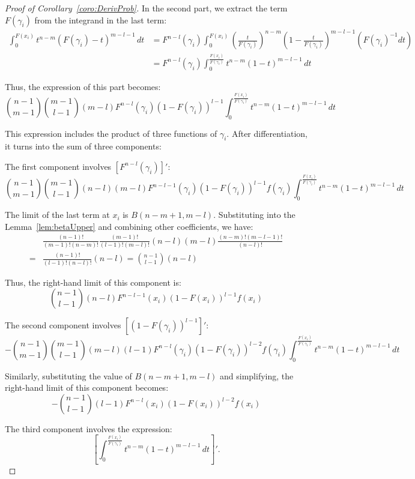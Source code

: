 \begin{proof}[Proof of Corollary~\ref{coro:DerivProb}]
In the second part, we extract the term \( F(\gamma_i) \) from the integrand in the last term:
\[
\begin{aligned}
    \int_{0}^{F(x_i)} t^{n-m} (F(\gamma_i) - t)^{m-l-1} \, dt &= F^{n-l}(\gamma_i) \int_{0}^{F(x_i)} \left(\frac{t}{F(\gamma_i)}\right)^{n-m} \left(1 - \frac{t}{F(\gamma_i)}\right)^{m-l-1} \left(F(\gamma_i)^{-1} dt\right) \\
    &= F^{n-l}(\gamma_i) \int_0^{\frac{F(x_i)}{F(\gamma_i)}} t^{n-m} (1-t)^{m-l-1} \, dt
\end{aligned}
\]

Thus, the expression of this part becomes:
\[
\binom{n-1}{m-1} \binom{m-1}{l-1} (m-l) F^{n-l}(\gamma_i) (1-F(\gamma_i))^{l-1} \int_0^{\frac{F(x_i)}{F(\gamma_i)}} t^{n-m} (1-t)^{m-l-1} \, dt
\]

This expression includes the product of three functions of \(\gamma_i\). After differentiation, it turns into the sum of three components:

The first component involves \([F^{n-l}(\gamma_i)]'\):
\[
\binom{n-1}{m-1} \binom{m-1}{l-1} (n-l) (m-l) F^{n-l-1}(\gamma_i) (1-F(\gamma_i))^{l-1} f(\gamma_i) \int_0^{\frac{F(x_i)}{F(\gamma_i)}} t^{n-m} (1-t)^{m-l-1} \, dt
\]

The limit of the last term at $x_i$ is \(B(n-m+1, m-l)\). Substituting into the Lemma~\ref{lem:betaUpper} and combining other coefficients, we have:
\[
\begin{aligned}
    & \frac{(n-1)!}{(m-1)!(n-m)!} \frac{(m-1)!}{(l-1)!(m-l)!} (n-l) (m-l) \frac{(n-m)!(m-l-1)!}{(n-l)!} \\
    = & \frac{(n-1)!}{(l-1)!(n-l)!} (n-l) = \binom{n-1}{l-1}(n-l)
\end{aligned}
\]

Thus, the right-hand limit of this component is:
\[
\binom{n-1}{l-1} (n-l) F^{n-l-1}(x_i) (1-F(x_i))^{l-1} f(x_i)
\]

The second component involves \([(1-F(\gamma_i))^{l-1}]'\):
\[
-\binom{n-1}{m-1} \binom{m-1}{l-1} (m-l)(l-1) F^{n-l}(\gamma_i) (1-F(\gamma_i))^{l-2} f(\gamma_i) \int_0^{\frac{F(x_i)}{F(\gamma_i)}} t^{n-m} (1-t)^{m-l-1} \, dt
\]

Similarly, substituting the value of \(B(n-m+1, m-l)\) and simplifying, the right-hand limit of this component becomes:
\[
-\binom{n-1}{l-1} (l-1) F^{n-l}(x_i) (1-F(x_i))^{l-2} f(x_i)
\]

The third component involves the expression:
\[
\left[ \int_0^{\frac{F(x_i)}{F(\gamma_i)}} t^{n-m}(1-t)^{m-l-1} \, dt \right]'.
\]


\end{proof}
